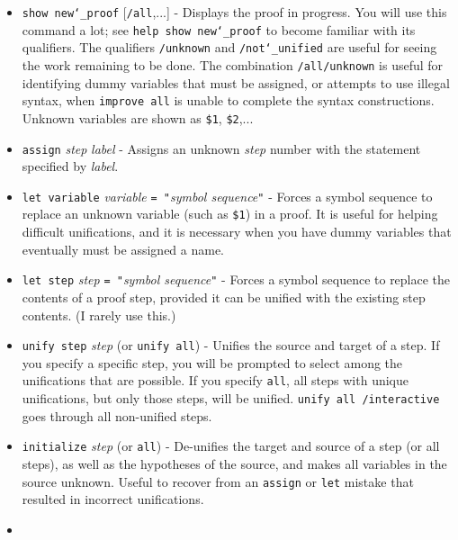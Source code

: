 \begin{itemize}
\item[]
    \texttt{show new{\char`\_}proof} [\texttt{/all},...] - Displays the
        proof in progress.  You will use this command a lot; see \texttt{help
        show new{\char`\_}proof} to become familiar with its qualifiers.  The
        qualifiers \texttt{/unknown} and \texttt{/not{\char`\_}unified} are
        useful for seeing the work remaining to be done.  The combination
        \texttt{/all/unknown} is useful for identifying dummy variables that must be
        assigned, or attempts to use illegal syntax, when \texttt{improve all}
        is unable to complete the syntax constructions.  Unknown variables are
        shown as \texttt{\$1}, \texttt{\$2},...
\item[]
    \texttt{assign} {\em step} {\em label} - Assigns an unknown {\em step}
        number with the statement
        specified by {\em label}.
\item[]
    \texttt{let variable} {\em variable}
        \texttt{= "}{\em symbol sequence}\texttt{"}
          - Forces a symbol
        sequence to replace an unknown variable (such as \texttt{\$1}) in a proof.
        It is useful
        for helping difficult unifications, and it is necessary when you have
        dummy variables that eventually must be assigned a name.
\item[]
    \texttt{let step} {\em step} \texttt{= "}{\em symbol sequence}\texttt{"} -
          Forces a symbol sequence
        to replace the contents of a proof step, provided it can be
        unified with the existing step contents.  (I rarely use this.)
\item[]
    \texttt{unify step} {\em step} (or \texttt{unify all}) - Unifies
        the source and target of
        a step.  If you specify a specific step, you will be prompted
        to select among the unifications that are possible.  If you
        specify \texttt{all}, all steps with unique unifications, but only
        those steps, will be
        unified.  \texttt{unify all /interactive} goes through all non-unified
        steps.
\item[]
    \texttt{initialize} {\em step} (or \texttt{all}) - De-unifies the target and source of
        a step (or all steps), as well as the hypotheses of the source,
        and makes all variables in the source unknown.  Useful to recover from
        an \texttt{assign} or \texttt{let} mistake that
        resulted in incorrect unifications.
\item[]

\end{itemize}
